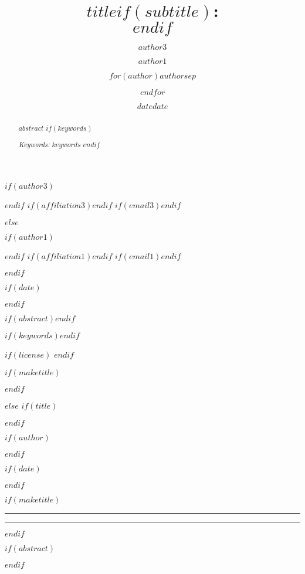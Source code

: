 \documentclass[$if(fontsize)$$fontsize$,$endif$$if(lang)$$lang$,$endif$$if(papersize)$$papersize$,$endif$$for(classoption)$$classoption$$sep$,$endfor$]{$documentclass$}
\begin{document}
$if(author3)$\author[c]{$author3$}$endif$
$if(affiliation3)$$endif$
$if(email3)$$endif$

$else$

$if(author1)$\author{$author1$}$endif$
$if(affiliation1)$$endif$
$if(email1)$$endif$

$endif$

$if(date)$\date{$date$}$endif$

$if(abstract)$$endif$

$if(keywords)$$endif$

$if(license)$
$endif$

$if(maketitle)$
\maketitle
\flushbottom
$endif$

$else$
$if(title)$\title{$title$$if(subtitle)$:\\\vspace{0.5em}{\large $subtitle$}$endif$}$endif$

$if(author)$\author{$for(author)$$author$$sep$ \and $endfor$}$endif$

$if(date)$\date{$date$}$endif$

$if(maketitle)$
\thispagestyle{empty}

\noindent\rule{\textwidth}{2pt}

{\let\newpage\relax\maketitle}

\noindent\rule{\textwidth}{2pt}

\vspace{0.6cm}
$endif$

$if(abstract)$
\begin{abstract}
\noindent $abstract$
$if(keywords)$

\emph{Keywords:} $keywords$
$endif$
\end{abstract}
$endif$
\end{document}
